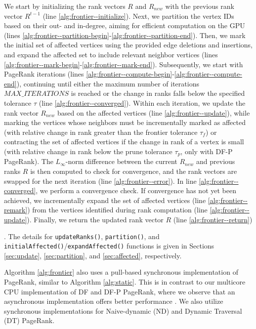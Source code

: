 We start by initializing the rank vectors $R$ and $R_{new}$ with the previous rank vector $R^{t-1}$ (line \ref{alg:frontier--initialize}). Next, we partition the vertex IDs based on their out- and in-degree, aiming for efficient computation on the GPU (lines \ref{alg:frontier--partition-begin}-\ref{alg:frontier--partition-end}). Then, we mark the initial set of affected vertices using the provided edge deletions and insertions, and expand the affected set to include relevant neighbor vertices (lines \ref{alg:frontier--mark-begin}-\ref{alg:frontier--mark-end}). Subsequently, we start with PageRank iterations (lines \ref{alg:frontier--compute-begin}-\ref{alg:frontier--compute-end}), continuing until either the maximum number of iterations $MAX\_ITERATIONS$ is reached or the change in ranks falls below the specified tolerance $\tau$ (line \ref{alg:frontier--converged}). Within each iteration, we update the rank vector $R_{new}$ based on the affected vertices (line \ref{alg:frontier--update}), while marking the vertices whose neighbors must be incrementally marked as affected (with relative change in rank greater than the frontier tolerance $\tau_f$) or contracting the set of affected vertices if the change in rank of a vertex is small (with relative change in rank below the prune tolerance $\tau_p$, only with DF-P PageRank). The $L_\infty$-norm difference between the current $R_{new}$ and previous ranks $R$ is then computed to check for convergence, and the rank vectors are swapped for the next iteration (line \ref{alg:frontier--error}). In line \ref{alg:frontier--converged}, we perform a convergence check. If convergence has not yet been achieved, we incrementally expand the set of affected vertices (line \ref{alg:frontier--remark}) from the vertices identified during rank computation (line \ref{alg:frontier--update}). Finally, we return the updated rank vector $R$ (line \ref{alg:frontier--return}). The details for \texttt{updateRanks()}, \texttt{partition()}, and \texttt{initialAffected()}/\texttt{expandAffected()} functions is given in Sections \ref{sec:update}, \ref{sec:partition}, and \ref{sec:affected}, respectively.

Algorithm \ref{alg:frontier} also uses a pull-based synchronous implementation of PageRank, similar to Algorithm \ref{alg:static}. This is in contrast to our multicore CPU implementation of DF and DF-P PageRank, where we observe that an asynchronous implementation offers better performance \cite{sahu2024df, sahu2024incrementally}. We also utilize synchronous implementations for Naive-dynamic (ND) and Dynamic Traversal (DT) PageRank.


